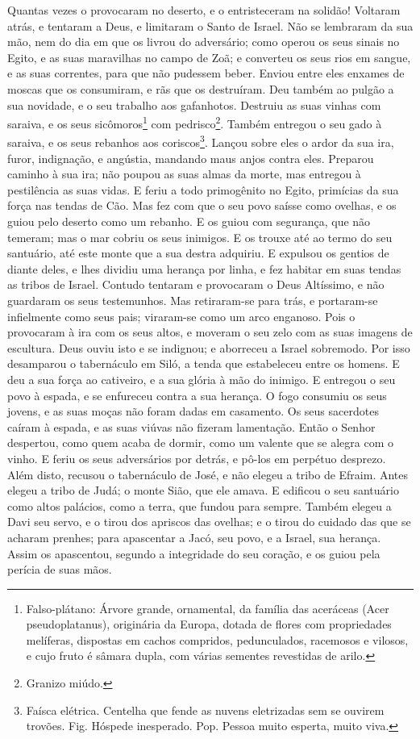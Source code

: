 Quantas vezes o provocaram no deserto, e o entristeceram na
solidão! Voltaram atrás, e tentaram a Deus, e limitaram o
Santo de Israel. Não se lembraram da sua mão, nem do dia em
que os livrou do adversário; como operou os seus sinais no
Egito, e as suas maravilhas no campo de Zoã; e converteu os
seus rios em sangue, e as suas correntes, para que não pudessem
beber. Enviou entre eles enxames de moscas que os consumiram,
e rãs que os destruíram. Deu também ao pulgão a sua novidade,
e o seu trabalho aos gafanhotos. Destruiu as suas vinhas com
saraiva, e os seus sicômoros\footnote{Falso-plátano: Árvore grande,
ornamental, da família das aceráceas (Acer pseudoplatanus),
originária da Europa, dotada de flores com propriedades melíferas,
dispostas em cachos compridos, pedunculados, racemosos e vilosos, e
cujo fruto é sâmara dupla, com várias sementes revestidas de arilo.}
com pedrisco\footnote{Granizo miúdo.}. Também entregou o seu
gado à saraiva, e os seus rebanhos aos coriscos\footnote{Faísca
elétrica. Centelha que fende as nuvens eletrizadas sem se ouvirem
trovões. Fig. Hóspede inesperado. Pop. Pessoa muito esperta, muito
viva.}. Lançou sobre eles o ardor da sua ira, furor,
indignação, e angústia, mandando maus anjos contra eles.
Preparou caminho à sua ira; não poupou as suas almas da
morte, mas entregou à pestilência as suas vidas. E feriu a
todo primogênito no Egito, primícias da sua força nas tendas de Cão.
Mas fez com que o seu povo saísse como ovelhas, e os guiou
pelo deserto como um rebanho. E os guiou com segurança, que
não temeram; mas o mar cobriu os seus inimigos. E os trouxe
até ao termo do seu santuário, até este monte que a sua destra
adquiriu. E expulsou os gentios de diante deles, e lhes
dividiu uma herança por linha, e fez habitar em suas tendas as
tribos de Israel. Contudo tentaram e provocaram o Deus
Altíssimo, e não guardaram os seus testemunhos. Mas
retiraram-se para trás, e portaram-se infielmente como seus pais;
viraram-se como um arco enganoso. Pois o provocaram à ira com
os seus altos, e moveram o seu zelo com as suas imagens de
escultura. Deus ouviu isto e se indignou; e aborreceu a
Israel sobremodo. Por isso desamparou o tabernáculo em Siló,
a tenda que estabeleceu entre os homens. E deu a sua força ao
cativeiro, e a sua glória à mão do inimigo. E entregou o seu
povo à espada, e se enfureceu contra a sua herança. O fogo
consumiu os seus jovens, e as suas moças não foram dadas em
casamento. Os seus sacerdotes caíram à espada, e as suas
viúvas não fizeram lamentação. Então o Senhor despertou, como
quem acaba de dormir, como um valente que se alegra com o vinho.
E feriu os seus adversários por detrás, e pô-los em perpétuo
desprezo. Além disto, recusou o tabernáculo de José, e não
elegeu a tribo de Efraim. Antes elegeu a tribo de Judá; o
monte Sião, que ele amava. E edificou o seu santuário como
altos palácios, como a terra, que fundou para sempre. Também
elegeu a Davi seu servo, e o tirou dos apriscos das ovelhas;
e o tirou do cuidado das que se acharam prenhes; para
apascentar a Jacó, seu povo, e a Israel, sua herança. Assim
os apascentou, segundo a integridade do seu coração, e os guiou pela
perícia de suas mãos.

